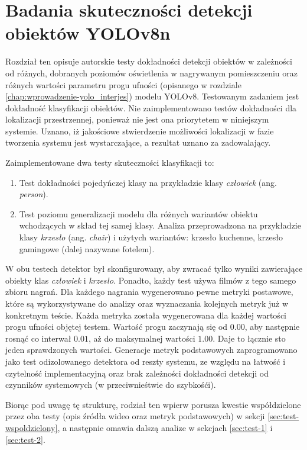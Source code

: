 \chapter{Badania skuteczności detekcji obiektów YOLOv8n}
\label{chap:badania-skutecznosci}
Rozdział ten opisuje autorskie testy dokładności detekcji obiektów w zależności od różnych, dobranych poziomów oświetlenia w nagrywanym pomieszczeniu oraz różnych wartości parametru progu ufności (opisanego w rozdziale \ref{chap:wprowadzenie-yolo_interjes}) modelu YOLOv8. Testowanym zadaniem jest dokładność klasyfikacji obiektów. Nie zaimplementowano testów dokładności dla lokalizacji przestrzennej, ponieważ nie jest ona priorytetem w niniejszym systemie. Uznano, iż jakościowe stwierdzenie możliwości lokalizacji w fazie tworzenia systemu jest wystarczające, a rezultat uznano za zadowalający. 

Zaimplementowane dwa testy skuteczności klasyfikacji to:
\begin{enumerate}
    \item Test dokładności pojedyńczej klasy na przykładzie klasy \emph{człowiek} (ang. \emph{person}). 
    \item  Test poziomu generalizacji modelu dla różnych wariantów obiektu wchodzących w skład tej samej klasy. Analiza przeprowadzona na przykładzie klasy \emph{krzesło} (ang. \emph{chair}) i użytych wariantów: krzesło kuchenne, krzesło gamingowe (dalej nazywane fotelem). 
\end{enumerate}
W obu testech detektor był skonfigurowany, aby zwracać tylko wyniki zawierające obiekty klas \emph{człowiek} i \emph{krzesło}. Ponadto, każdy test używa filmów z tego samego zbioru nagrań. Dla każdego nagrania wygenerowano pewne metryki postawowe, które są wykorzystywane do analizy oraz wyznaczania kolejnych metryk już w konkretnym teście. Każda metryka została wygenerowana dla każdej wartości progu ufności objętej testem. Wartość progu zaczynają się od $0.00$, aby następnie rosnąć co interwał $0.01$, aż do maksymalnej wartości $1.00$. Daje to łącznie sto jeden sprawdzonych wartości. Generacje metryk podstawowych zaprogramowano jako test odizolowanego detektora od reszty systemu, ze względu na łatwość i czytelność implementacyjną oraz brak zależności dokładności detekcji od czynników systemowych (w przeciwnieśtwie do szybkośći).  

Biorąc pod uwagę tę strukturę, rodział ten wpierw porusza kwestie współdzielone przez oba testy (opis źródła wideo oraz metryk podstawowych) w sekcji \ref{sec:test-wspoldzielony}, a następnie omawia dalszą analize w sekcjach \ref{sec:test-1} i \ref{sec:test-2}.
 
